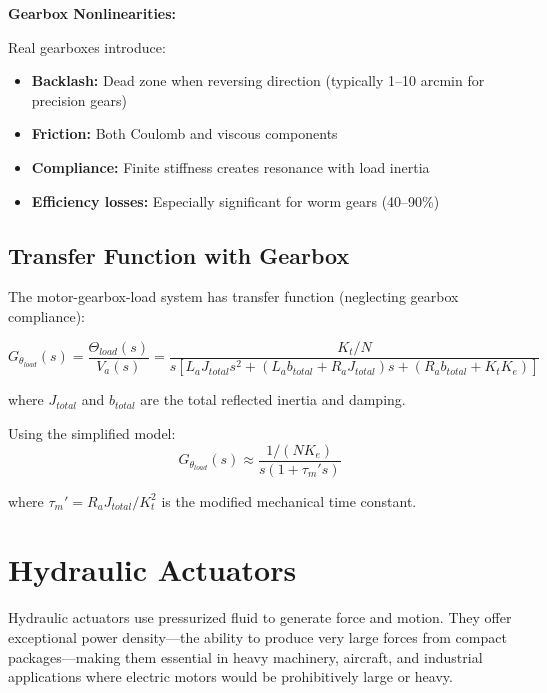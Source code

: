 \textbf{Gearbox Nonlinearities:}

Real gearboxes introduce:
\begin{itemize}
    \item \textbf{Backlash:} Dead zone when reversing direction (typically 1--10 arcmin for precision gears)
    \item \textbf{Friction:} Both Coulomb and viscous components
    \item \textbf{Compliance:} Finite stiffness creates resonance with load inertia
    \item \textbf{Efficiency losses:} Especially significant for worm gears (40--90\%)
\end{itemize}

\subsection{Transfer Function with Gearbox}

The motor-gearbox-load system has transfer function (neglecting gearbox compliance):

\begin{equation}
    G_{\theta_{load}}(s) = \frac{\Theta_{load}(s)}{V_a(s)} = \frac{K_t / N}{s[L_a J_{total} s^2 + (L_a b_{total} + R_a J_{total})s + (R_a b_{total} + K_t K_e)]}
\end{equation}

where $J_{total}$ and $b_{total}$ are the total reflected inertia and damping.

Using the simplified model:
\begin{equation}
    \boxed{G_{\theta_{load}}(s) \approx \frac{1/(N K_e)}{s(1 + \tau_m' s)}}
\end{equation}

where $\tau_m' = R_a J_{total} / K_t^2$ is the modified mechanical time constant.

\section{Hydraulic Actuators}
\label{sec:hydraulic_actuators}

Hydraulic actuators use pressurized fluid to generate force and motion. They offer exceptional power density---the ability to produce very large forces from compact packages---making them essential in heavy machinery, aircraft, and industrial applications where electric motors would be prohibitively large or heavy.

